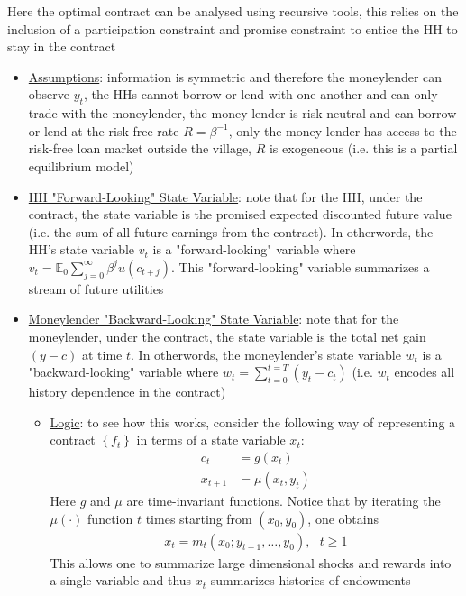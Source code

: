 \documentclass{article}
\begin{document}
Here the optimal contract can be analysed using recursive tools, this relies on the inclusion of a participation constraint and promise constraint to entice the HH to stay in the contract
\begin{itemize}
    \item  \underline{Assumptions}: information is symmetric and therefore the moneylender can observe $y_{t}$, the HHs cannot borrow or lend with one another and can only trade with the moneylender, the money lender is risk-neutral and can borrow or lend at the risk free rate $R = \beta^{-1}$, only the money lender has access to the risk-free loan market outside the village, $R$ is exogeneous (i.e. this is a partial equilibrium model)
    \item  \underline{HH "Forward-Looking" State Variable}: note that for the HH, under the contract, the state variable is the promised expected discounted future value (i.e. the sum of all future earnings from the contract). In otherwords, the HH's state variable $v_{t}$ is a "forward-looking" variable where  $v_{t} = \mathbb{E}_{0} \sum_{j=0}^{\infty} \beta^{j} u(c_{t+j})$. This "forward-looking" variable summarizes a stream of future utilities
    \item \underline{Moneylender "Backward-Looking" State Variable}: note that for the moneylender, under the contract, the state variable is the total net gain $(y- c)$ at time $t$. In otherwords, the moneylender's state variable $w_{t}$ is a "backward-looking" variable where $w_{t} = \sum_{t=0}^{t=T} (y_{t} - c_{t})$ (i.e. $w_{t}$ encodes all history dependence in the contract)
    \begin{itemize}
        \item \underline{Logic}: to see how this works, consider the following way of representing a contract $\left\{ f_{t} \right\}$ in terms of a state variable $x_{t}$:
        \begin{align*}
            c_{t} &= g(x_{t}) \\
            x_{t+1} &= \mu (x_{t}, y_{t})
        \end{align*}
        Here $g$ and $\mu$ are time-invariant functions. Notice that by iterating the $\mu(\cdot)$ function $t$ times starting from $(x_{0}, y_{0})$, one obtains
        \begin{gather*}
            x_{t} = m_{t}(x_{0}; y_{t-1}, \dots, y_{0}), \ \ \ t \geq 1
        \end{gather*}
        This allows one to summarize large dimensional shocks and rewards into a single variable and thus $x_{t}$ summarizes histories of endowments

\end{itemize}
\end{itemize}
\end{document}
